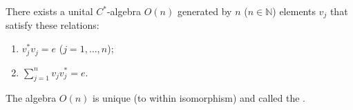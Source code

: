 There exists a unital $C^*$-algebra $O(n)$ generated by $n$ ($n \in \mathbb{N}$) elements $v_j$ that satisfy these relations:
\begin{enumerate}
\item[(i)] $v_j^* v_j = e$ ($j = 1, \ldots, n$);
\item[(ii)] $\sum_{j=1}^{n} v_j v_j^* = e$.
\end{enumerate}
The algebra $O(n)$ is unique (to within isomorphism) and called the .
